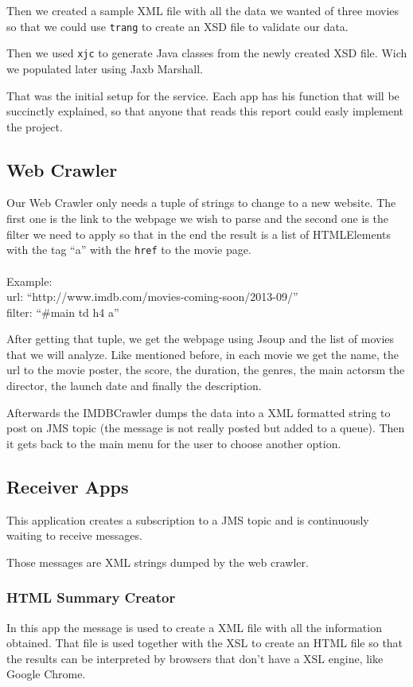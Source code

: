 \documentclass[12pt]{article}
\begin{document}
Then we created a sample XML file with all the data we wanted of three movies so that we could use \texttt{trang} to create an XSD file to validate our data.

Then we used \texttt{xjc} to generate Java classes from the newly created XSD file. Wich we populated later using Jaxb Marshall.

That was the initial setup for the service. Each app has his function that will be succinctly explained, so that anyone that reads this report could easly implement the project.

\subsection{Web Crawler}
\indent \indent Our Web Crawler only needs a tuple of strings to change to a new website. The first one is the link to the webpage we wish to parse and the second one is the filter we need to apply so that in the end the result is a list of HTMLElements with the tag ``a'' with the \texttt{href} to the movie page.\\
\\Example:\\url: ``http://www.imdb.com/movies-coming-soon/2013-09/''\\filter: ``\#main td h4 a''

After getting that tuple, we get the webpage using Jsoup and the list of movies that we will analyze. Like mentioned before, in each movie we get the name, the url to the movie poster, the score, the duration, the genres, the main actorsm the director, the launch date and finally the description.

Afterwards the IMDBCrawler dumps the data into a XML formatted string to post on JMS topic (the message is not really posted but added to a queue). Then it gets back to the main menu for the user to choose another option.

\clearpage
\subsection{Receiver Apps}
\indent \indent This application creates a subscription to a JMS topic and is continuously waiting to receive messages.

Those messages are XML strings dumped by the web crawler.
\subsubsection{HTML Summary Creator}
\indent \indent In this app the message is used to create a XML file with all the information obtained. That file is used together with the XSL to create an HTML file so that the results can be interpreted by browsers that don't have a XSL engine, like Google Chrome.
\end{document}
